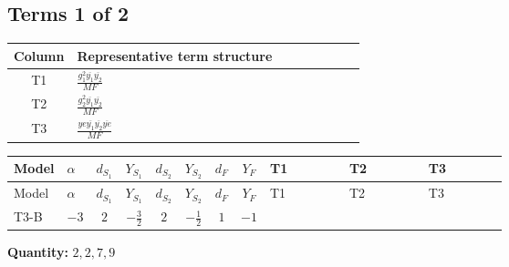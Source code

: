 \documentclass[8pt]{article}
\begin{document}
\begin{landscape}
\subsection*{Terms 1 of 2}
\begin{center}
\begin{tabular}{@{}c >{\raggedright\arraybackslash}p{0.82\linewidth}@{}}
\toprule
Column & Representative term structure \\
\midrule
T1 & \(\displaystyle \frac{g_{1}^{2} \overline{y_{1}} \overline{y_{2}}}{MF}\) \\
\midrule
T2 & \(\displaystyle \frac{g_{2}^{2} \overline{y_{1}} \overline{y_{2}}}{MF}\) \\
\midrule
T3 & \(\displaystyle \frac{ye \overline{y_{1}} \overline{y_{2}} \overline{ye}}{MF}\) \\
\midrule
\bottomrule
\end{tabular}
\end{center}
\smallskip
\tiny
\begin{longtable}{@{}llcccccc >{\raggedright\arraybackslash}p{0.21\linewidth} >{\raggedright\arraybackslash}p{0.21\linewidth} >{\raggedright\arraybackslash}p{0.21\linewidth}@{}}
\toprule
Model & $\alpha$ & $d_{S_1}$ & $Y_{S_1}$ & $d_{S_2}$ & $Y_{S_2}$ & $d_F$ & $Y_F$ & T1 & T2 & T3 \\
\midrule
\endfirsthead
\toprule
Model & $\alpha$ & $d_{S_1}$ & $Y_{S_1}$ & $d_{S_2}$ & $Y_{S_2}$ & $d_F$ & $Y_F$ & T1 & T2 & T3 \\
\midrule
\endhead
T3-B & $-3$ & $2$ & $-\frac{3}{2}$ & $2$ & $-\frac{1}{2}$ & $1$ & $-1$ & \scriptsize\adjustbox{max width=\linewidth}{$\begin{gathered} \frac{3 g_{1}^{2} \overline{y_{1}} \overline{y_{2}}}{2 MF}\end{gathered}$} & \scriptsize\adjustbox{max width=\linewidth}{$\begin{gathered} \frac{3 g_{2}^{2} \overline{y_{1}} \overline{y_{2}}}{4 MF}\end{gathered}$} & \scriptsize\adjustbox{max width=\linewidth}{$\begin{gathered} - \frac{ye \overline{y_{1}} \overline{y_{2}} \overline{ye}}{4 MF}\end{gathered}$} \\
\midrule
\bottomrule
\end{longtable}
\clearpage
\noindent\textbf{Quantity: }$\mathrm{2,2,7,9}$\par\smallskip

\end{landscape}
\end{document}
